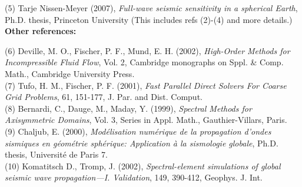 \documentclass{article}
\begin{document}
(5) Tarje Nissen-Meyer (2007),
\textit{Full-wave seismic sensitivity in a spherical Earth},
Ph.D. thesis, Princeton University
(This includes refs (2)-(4) and more details.)\\
% 


\noindent \textbf{Other references:}\vspace*{0.2cm}

(6) Deville, M. O., Fischer, P. F., Mund, E. H. (2002), 
\textit{High-Order Methods for Incompressible Fluid Flow}, 
Vol. 2, Cambridge monographs on Sppl. \& Comp. Math., Cambridge University Press.\\

(7) Tufo, H. M., Fischer, P. F. (2001), \textit{Fast Parallel Direct Solvers For Coarse
Grid Problems}, 61, 151-177, J. Par. and Dist. Comput.\\

(8) Bernardi, C., Dauge, M., Maday, Y. (1999), \textit{Spectral Methods for Axisymmetric
Domains}, Vol. 3, Series in Appl. Math., Gauthier-Villars, Paris.\\

(9) Chaljub, E. (2000), \textit{Mod{\'{e}}lisation num{\'{e}}rique de la 
propagation d'ondes sismiques en g{\'{e}}om{\'{e}}trie sph{\'{e}}rique:
Application {\`{a}} la sismologie globale}, 
Ph.D. thesis, Universit{\'{e}} de Paris 7.\\

(10) Komatitsch D., Tromp, J. (2002), \textit{Spectral-element simulations of
global seismic wave propagation---I. Validation},
149, 390-412, Geophys. J. Int.
\end{document}
